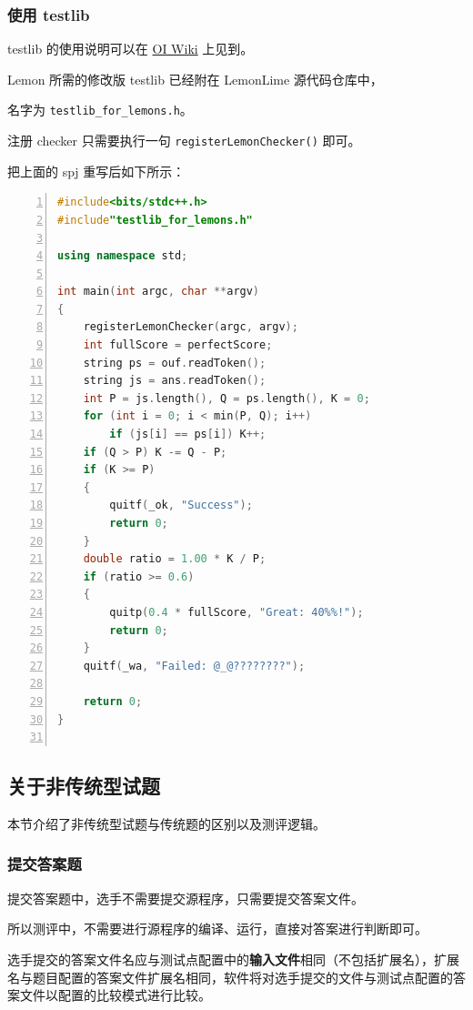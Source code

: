 \documentclass[UTF-8]{ctexart}
\begin{document}
			\subsubsection{使用 testlib}
			
				testlib 的使用说明可以在 \href{https://oi-wiki.org/intro/testlib/}{OI Wiki} 上见到。
				
				Lemon 所需的修改版 testlib 已经附在 LemonLime 源代码仓库中，
				
				名字为 \texttt{testlib\_for\_lemons.h}。
				
				注册 checker 只需要执行一句 \texttt{registerLemonChecker()} 即可。
				
				把上面的 spj 重写后如下所示：
		
				\begin{lstlisting}[language={C++},numbers=left,showspaces=false,showstringspaces=false,frame=shadowbox,basicstyle=\ttfamily]
#include<bits/stdc++.h>
#include"testlib_for_lemons.h"

using namespace std;

int main(int argc, char **argv)
{
	registerLemonChecker(argc, argv);
	int fullScore = perfectScore;
	string ps = ouf.readToken();
	string js = ans.readToken();
	int P = js.length(), Q = ps.length(), K = 0;
	for (int i = 0; i < min(P, Q); i++)
		if (js[i] == ps[i]) K++;
	if (Q > P) K -= Q - P;
	if (K >= P)
	{
		quitf(_ok, "Success");
		return 0;
	}
	double ratio = 1.00 * K / P;
	if (ratio >= 0.6)
	{
		quitp(0.4 * fullScore, "Great: 40%%!");
		return 0;
	}
	quitf(_wa, "Failed: @_@????????");
	
	return 0;
}
		
				\end{lstlisting}
				
				
		\subsection{关于非传统型试题}
				
			本节介绍了非传统型试题与传统题的区别以及测评逻辑。
				
			\subsubsection{提交答案题}
				
				提交答案题中，选手不需要提交源程序，只需要提交答案文件。
				
				所以测评中，不需要进行源程序的编译、运行，直接对答案进行判断即可。
				
				选手提交的答案文件名应与测试点配置中的\textbf{输入文件}相同（不包括扩展名），扩展名与题目配置的答案文件扩展名相同，软件将对选手提交的文件与测试点配置的答案文件以配置的比较模式进行比较。
				
\end{document}
